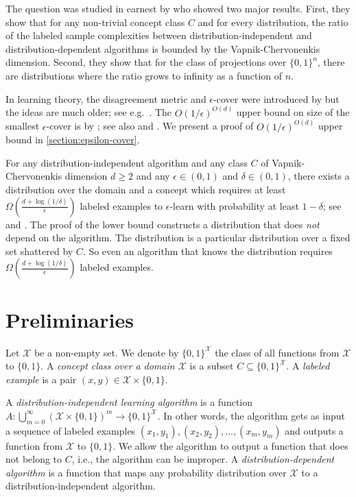 \documentclass[11pt]{article}
\newcommand{\X}{\mathcal{X}}
\begin{document}
The question was studied in earnest by \citet{Darnstadt-Simon-Szorenyi-2013} who
showed two major results. First, they show that for any non-trivial concept
class $C$ and for every distribution, the ratio of the labeled sample
complexities between distribution-independent and distribution-dependent
algorithms is bounded by the Vapnik-Chervonenkis dimension. Second, they show
that for the class of projections over $\{0,1\}^n$, there are distributions
where the ratio grows to infinity as a function of $n$.

In learning theory, the disagreement metric and $\epsilon$-cover were introduced
by \citet{Benedek-Itai-1991} but the ideas are much older; see
e.g.~\citet{Dudley-1978, Dudley-1984}. The $O(1/\epsilon)^{O(d)}$ upper bound on
size of the smallest $\epsilon$-cover is by \citet[Lemma 7.13]{Dudley-1978}; see
also \citet[Chapter 4]{Devroye-Lugosi-2000} and \citet{Haussler-1995}. We
present a proof of $O(1/\epsilon)^{O(d)}$ upper bound in
\autoref{section:epsilon-cover}.

For any distribution-independent algorithm and any class $C$ of
Vapnik-Chervonenkis dimension $d \ge 2$ and any $\epsilon \in (0,1)$ and $\delta
\in (0,1)$, there exists a distribution over the domain and a concept which
requires at least $\Omega \left(\frac{d + \log(1/\delta)}{\epsilon}\right)$
labeled examples to $\epsilon$-learn with probability at least $1 - \delta$;
see~\citet[Theorem 5.3]{Anthony-Bartlett-1999} and
\citet{Blumer-Ehrenfeucht-Haussler-Warmuth-1989,
Ehrenfeucht-Haussler-Kearns-Valiant-1989}. The proof of the lower bound
constructs a distribution that does \emph{not} depend on the algorithm. The
distribution is a particular distribution over a fixed set shattered by $C$. So
even an algorithm that knows the distribution requires $\Omega \left(\frac{d +
\log(1/\delta)}{\epsilon}\right)$ labeled examples.


\section{Preliminaries}
\label{section:preliminaries}

Let $\X$ be a non-empty set. We denote by $\{0,1\}^\X$ the class of all
functions from $\X$ to $\{0,1\}$. A \emph{concept class over a domain $\X$} is a
subset $C \subseteq \{0,1\}^\X$. A \emph{labeled example} is a pair $(x,y) \in
\X \times \{0,1\}$.

A \emph{distribution-independent learning algorithm} is a function
$A:\bigcup_{m=0}^\infty \left(\X \times \{0,1\} \right)^m \to \{0,1\}^\X$. In
other words, the algorithm gets as input a sequence of labeled examples $(x_1,
y_1), (x_2, y_2), \dots, (x_m, y_m)$ and outputs a function from $\X$ to
$\{0,1\}$. We allow the algorithm to output a function that does not belong to
$C$, i.e., the algorithm can be improper. A \emph{distribution-dependent
algorithm} is a function that maps any probability distribution over $\X$ to a
distribution-independent algorithm.
\end{document}
